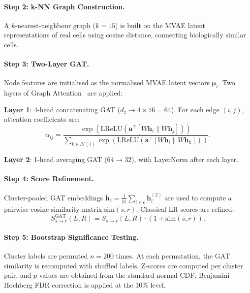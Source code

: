 \documentclass[11pt,a4paper]{article}
\newcommand{\bmu}{\boldsymbol{\mu}}
\begin{document}
\paragraph{Step 2: k-NN Graph Construction.}
A $k$-nearest-neighbour graph ($k=15$) is built on the MVAE latent representations of real cells using cosine distance, connecting biologically similar cells.

\paragraph{Step 3: Two-Layer GAT.}
Node features are initialised as the normalised MVAE latent vectors $\bmu_i$.
Two layers of Graph Attention~\citep{velickovic2018} are applied:

\textbf{Layer 1}: 4-head concatenating GAT ($d_z \to 4 \times 16 = 64$).
For each edge $(i,j)$, attention coefficients are:
\begin{equation}\label{eq:gat_attn}
  \alpha_{ij} = \frac{\exp\!\left(\text{LReLU}\!\left(\mathbf{a}^\top [W\mathbf{h}_i \| W\mathbf{h}_j]\right)\right)}{\sum_{k\in\mathcal{N}(i)}\exp\!\left(\text{LReLU}\!\left(\mathbf{a}^\top [W\mathbf{h}_i \| W\mathbf{h}_k]\right)\right)}.
\end{equation}

\textbf{Layer 2}: 1-head averaging GAT ($64 \to 32$), with LayerNorm after each layer.

\paragraph{Step 4: Score Refinement.}
Cluster-pooled GAT embeddings $\bar{\mathbf{h}}_c = \frac{1}{|c|}\sum_{i\in c}\mathbf{h}_i^{(2)}$ are used to compute a pairwise cosine similarity matrix $\text{sim}(s,r)$.
Classical LR scores are refined:
\begin{equation}\label{eq:gat_refine}
  S_{s\to r}^\text{GAT}(L,R) = S_{s\to r}(L,R) \cdot \left(1 + \text{sim}(s,r)\right).
\end{equation}

\paragraph{Step 5: Bootstrap Significance Testing.}
Cluster labels are permuted $n=200$ times.
At each permutation, the GAT similarity is recomputed with shuffled labels.
Z-scores are computed per cluster pair, and $p$-values are obtained from the standard normal CDF.
Benjamini-Hochberg FDR correction is applied at the 10\% level.
\end{document}

